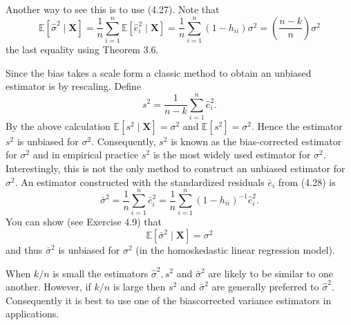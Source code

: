 \documentclass[10pt]{article}
\begin{document}
Another way to see this is to use (4.27). Note that
$$
\mathbb{E}\left[\widehat{\sigma}^{2} \mid \boldsymbol{X}\right]=\frac{1}{n} \sum_{i=1}^{n} \mathbb{E}\left[\widehat{e}_{i}^{2} \mid \boldsymbol{X}\right]=\frac{1}{n} \sum_{i=1}^{n}\left(1-h_{i i}\right) \sigma^{2}=\left(\frac{n-k}{n}\right) \sigma^{2}
$$
the last equality using Theorem 3.6.

Since the bias takes a scale form a classic method to obtain an unbiased estimator is by rescaling. Define
$$
s^{2}=\frac{1}{n-k} \sum_{i=1}^{n} \widehat{e}_{i}^{2} .
$$
By the above calculation $\mathbb{E}\left[s^{2} \mid \boldsymbol{X}\right]=\sigma^{2}$ and $\mathbb{E}\left[s^{2}\right]=\sigma^{2}$. Hence the estimator $s^{2}$ is unbiased for $\sigma^{2}$. Consequently, $s^{2}$ is known as the bias-corrected estimator for $\sigma^{2}$ and in empirical practice $s^{2}$ is the most widely used estimator for $\sigma^{2}$. Interestingly, this is not the only method to construct an unbiased estimator for $\sigma^{2}$. An estimator constructed with the standardized residuals $\bar{e}_{i}$ from (4.28) is
$$
\bar{\sigma}^{2}=\frac{1}{n} \sum_{i=1}^{n} \bar{e}_{i}^{2}=\frac{1}{n} \sum_{i=1}^{n}\left(1-h_{i i}\right)^{-1} \widehat{e}_{i}^{2} .
$$
You can show (see Exercise 4.9) that
$$
\mathbb{E}\left[\bar{\sigma}^{2} \mid \boldsymbol{X}\right]=\sigma^{2}
$$
and thus $\bar{\sigma}^{2}$ is unbiased for $\sigma^{2}$ (in the homoskedastic linear regression model).

When $k / n$ is small the estimators $\widehat{\sigma}^{2}, s^{2}$ and $\bar{\sigma}^{2}$ are likely to be similar to one another. However, if $k / n$ is large then $s^{2}$ and $\bar{\sigma}^{2}$ are generally preferred to $\widehat{\sigma}^{2}$. Consequently it is best to use one of the biascorrected variance estimators in applications.
\end{document}
